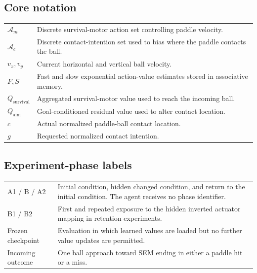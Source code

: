 \documentclass[10pt,twocolumn]{article}
\begin{document}
\vspace{1em}
\subsection*{Core notation}
\begin{tabularx}{\textwidth}{@{}p{}X@{}}
$\mathcal{A}_m$ & Discrete survival-motor action set controlling paddle velocity. \\
$\mathcal{A}_c$ & Discrete contact-intention set used to bias where the paddle contacts the ball. \\
$v_x, v_y$ & Current horizontal and vertical ball velocity. \\
$F, S$ & Fast and slow exponential action-value estimates stored in associative memory. \\
$Q_{\mathrm{survival}}$ & Aggregated survival-motor value used to reach the incoming ball. \\
$Q_{\mathrm{aim}}$ & Goal-conditioned residual value used to alter contact location. \\
$c$ & Actual normalized paddle-ball contact location. \\
$g$ & Requested normalized contact intention. \\
\end{tabularx}

\vspace{1em}
\subsection*{Experiment-phase labels}
\begin{tabularx}{\textwidth}{@{}p{}X@{}}
A1 / B / A2 & Initial condition, hidden changed condition, and return to the initial condition. The agent receives no phase identifier. \\
B1 / B2 & First and repeated exposure to the hidden inverted actuator mapping in retention experiments. \\
Frozen checkpoint & Evaluation in which learned values are loaded but no further value updates are permitted. \\
Incoming outcome & One ball approach toward SEM ending in either a paddle hit or a miss. \\
\end{tabularx}
\end{document}
